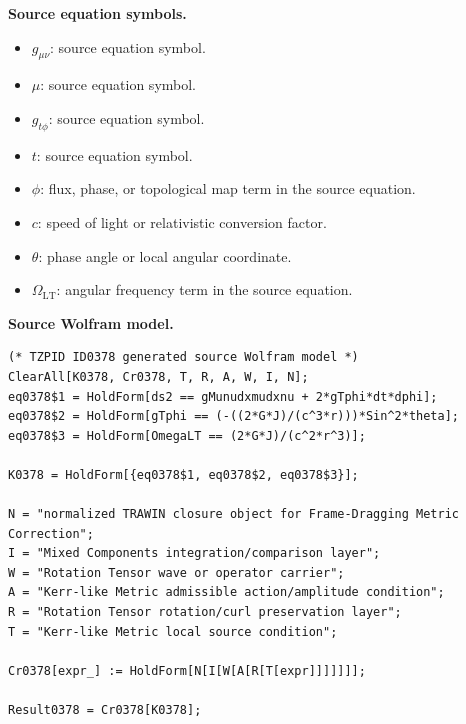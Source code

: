 \begin{minipage}[t]{0.49\linewidth}
\begingroup
\small
\raggedright
\textbf{Source equation symbols.}\par
\begin{itemize}[leftmargin=1.35em,itemsep=1pt,topsep=1pt,parsep=0pt]
    \item $g_{\mu\nu}$: source equation symbol.
    \item $\mu$: source equation symbol.
    \item $g_{t\phi}$: source equation symbol.
    \item $t$: source equation symbol.
    \item $\phi$: flux, phase, or topological map term in the source equation.
    \item $c$: speed of light or relativistic conversion factor.
    \item $\theta$: phase angle or local angular coordinate.
    \item $\Omega_{\mathrm{LT}}$: angular frequency term in the source equation.
\end{itemize}
\endgroup
\end{minipage}\hfill
\begin{minipage}[t]{0.47\linewidth}
\begingroup
\scriptsize
\raggedright
\textbf{Source Wolfram model.}\par
\begin{Verbatim}[fontsize=\tiny,breaklines=true,breakanywhere=true]
(* TZPID ID0378 generated source Wolfram model *)
ClearAll[K0378, Cr0378, T, R, A, W, I, N];
eq0378$1 = HoldForm[ds2 == gMunudxmudxnu + 2*gTphi*dt*dphi];
eq0378$2 = HoldForm[gTphi == (-((2*G*J)/(c^3*r)))*Sin^2*theta];
eq0378$3 = HoldForm[OmegaLT == (2*G*J)/(c^2*r^3)];

K0378 = HoldForm[{eq0378$1, eq0378$2, eq0378$3}];

N = "normalized TRAWIN closure object for Frame-Dragging Metric Correction";
I = "Mixed Components integration/comparison layer";
W = "Rotation Tensor wave or operator carrier";
A = "Kerr-like Metric admissible action/amplitude condition";
R = "Rotation Tensor rotation/curl preservation layer";
T = "Kerr-like Metric local source condition";

Cr0378[expr_] := HoldForm[N[I[W[A[R[T[expr]]]]]]];

Result0378 = Cr0378[K0378];
\end{Verbatim}
\endgroup
\end{minipage}

